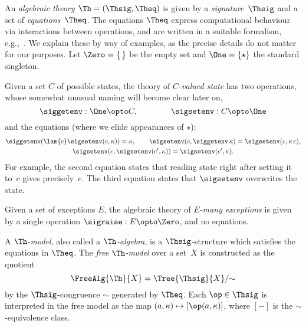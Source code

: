 An \emph{algebraic theory $\Th = (\Thsig, \Theq)$} is given by a \emph{signature~$\Thsig$} and
a set of \emph{equations~$\Theq$}.
%
The equations $\Theq$ express computational behaviour via interactions between
operations, and
are written in a suitable formalism, e.g.,~\cite{Plotkin:HandlingEffects}. We
explain these by way of examples, as the precise details do not matter for our purposes.
Let $\Zero = \{\,\}$ be the empty set and $\One = \{\star\}$ the standard singleton.

\begin{example}
  \label{ex:state}
  Given a set $C$ of possible states, the theory of \emph{$C$-valued state} has two operations, whose
  somewhat unusual naming will become clear later on,
  \begin{equation*}
    \siggetenv : \One \opto C,
    \qquad\qquad
    \sigsetenv : C \opto \One
  \end{equation*}
  and the equations (where we elide appearances of $\star$):
  \begin{gather*}
    \siggetenv (\lam{c} \sigsetenv(c, \kappa)) = \kappa,
    \qquad
    \sigsetenv (c, \siggetenv\, \kappa) = \sigsetenv(c, \kappa\, c), \\
    \sigsetenv (c, \sigsetenv(c', \kappa)) = \sigsetenv(c', \kappa).
  \end{gather*}
  For example,
  the second equation states that reading state right after setting it to~$c$ gives precisely~$c$.
  The third equation states that $\sigsetenv$ overwrites the state.
\end{example}

\begin{example}
  \label{ex:exceptions}
  Given a set of exceptions $E$, the algebraic theory of \emph{$E$-many exceptions} is given by
  a single operation $\sigraise : E \opto \Zero$, and no equations.
\end{example}

A \emph{$\Th$-model}, also called a \emph{$\Th$-algebra}, is a $\Thsig$-structure which
satisfies the equations in $\Theq$. The \emph{free $\Th$-model} over a set~$X$ is constructed
as the quotient
%
\begin{equation*}
  \FreeAlg{\Th}{X} = \Tree{\Thsig}{X}/{\sim}
\end{equation*}
%
by the $\Thsig$-congruence $\sim$ generated by $\Theq$. Each $\op \in \Thsig$
is interpreted in the free model as the map
$(a, \kappa) \mapsto [\op(a, \kappa)]$, where $[{-}]$ is the $\sim$-equivalence class.

